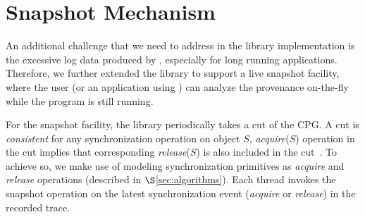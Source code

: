 \section{Snapshot Mechanism}
\label{sec:snapshot}
An additional challenge that we need to address in the library implementation is the excessive log data produced by \intelpt, especially for long running applications. Therefore, we further extended the library to support a live snapshot facility, where the user (or an application using \projecttitle) can analyze the provenance on-the-fly while the program is still running.

For the snapshot facility, the library periodically takes a cut of the CPG. A cut is {\em consistent} for any synchronization operation on object $S$,  {\em acquire}($S$) operation in the cut implies that corresponding {\em release}($S$) is also included in the cut~\cite{chandy-lamport}.  To achieve so, we make use of modeling synchronization primitives as {\em acquire} and {\em release} operations (described in $\S$\ref{sec:algorithms}). Each thread invokes the snapshot operation on the latest  synchronization event ({\em acquire} or {\em release}) in the recorded trace.



 